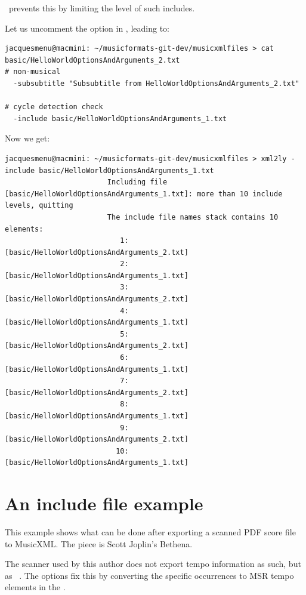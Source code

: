 \mf\ prevents this by limiting the level of such includes.

Let us uncomment the  option in , leading to:
\begin{lstlisting}[language=Terminal]
jacquesmenu@macmini: ~/musicformats-git-dev/musicxmlfiles > cat basic/HelloWorldOptionsAndArguments_2.txt
# non-musical
  -subsubtitle "Subsubtitle from HelloWorldOptionsAndArguments_2.txt"

# cycle detection check
  -include basic/HelloWorldOptionsAndArguments_1.txt
\end{lstlisting}

Now we get:
\begin{lstlisting}[language=Terminal]
jacquesmenu@macmini: ~/musicformats-git-dev/musicxmlfiles > xml2ly -include basic/HelloWorldOptionsAndArguments_1.txt
                        Including file [basic/HelloWorldOptionsAndArguments_1.txt]: more than 10 include levels, quitting
                        The include file names stack contains 10 elements:
                           1: [basic/HelloWorldOptionsAndArguments_2.txt]
                           2: [basic/HelloWorldOptionsAndArguments_1.txt]
                           3: [basic/HelloWorldOptionsAndArguments_2.txt]
                           4: [basic/HelloWorldOptionsAndArguments_1.txt]
                           5: [basic/HelloWorldOptionsAndArguments_2.txt]
                           6: [basic/HelloWorldOptionsAndArguments_1.txt]
                           7: [basic/HelloWorldOptionsAndArguments_2.txt]
                           8: [basic/HelloWorldOptionsAndArguments_1.txt]
                           9: [basic/HelloWorldOptionsAndArguments_2.txt]
                          10: [basic/HelloWorldOptionsAndArguments_1.txt]
\end{lstlisting}


\section{An include file example}

This example shows what can be done after exporting a scanned PDF score file to MusicXML. The piece is Scott Joplin's Bethena.

The scanner used by this author does not export tempo information as such, but as \mxml\ . The  options fix this by converting the specific occurrences to MSR tempo elements in the  \pass.

